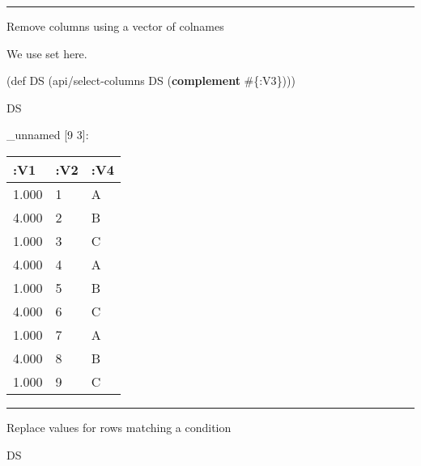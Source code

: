 \documentclass[]{article}
\newenvironment{Shaded}{\begin{snugshade}}{\end{snugshade}}
\newcommand{\KeywordTok}[1]{\textcolor[rgb]{0.13,0.29,0.53}{\textbf{#1}}}
\newcommand{\FloatTok}[1]{\textcolor[rgb]{0.00,0.00,0.81}{#1}}
\newcommand{\FunctionTok}[1]{\textcolor[rgb]{0.00,0.00,0.00}{#1}}
\newcommand{\VariableTok}[1]{\textcolor[rgb]{0.00,0.00,0.00}{#1}}
\newcommand{\BuiltInTok}[1]{#1}
\newcommand{\AttributeTok}[1]{\textcolor[rgb]{0.77,0.63,0.00}{#1}}
\newcommand{\NormalTok}[1]{#1}
\begin{document}
\begin{center}\rule{0.5\linewidth}{0.5pt}\end{center}

Remove columns using a vector of colnames

We use set here.

\begin{Shaded}
\begin{Highlighting}[]
\NormalTok{(}\BuiltInTok{def}\FunctionTok{ DS }\NormalTok{(api/select-columns DS (}\KeywordTok{complement}\NormalTok{ #\{}\AttributeTok{:V3}\NormalTok{\})))}
\end{Highlighting}
\end{Shaded}

\begin{Shaded}
\begin{Highlighting}[]
\NormalTok{DS}
\end{Highlighting}
\end{Shaded}

\_unnamed {[}9 3{]}:

\begin{longtable}[]{@{}lll@{}}
\toprule
:V1 & :V2 & :V4\tabularnewline
\midrule
\endhead
1.000 & 1 & A\tabularnewline
4.000 & 2 & B\tabularnewline
1.000 & 3 & C\tabularnewline
4.000 & 4 & A\tabularnewline
1.000 & 5 & B\tabularnewline
4.000 & 6 & C\tabularnewline
1.000 & 7 & A\tabularnewline
4.000 & 8 & B\tabularnewline
1.000 & 9 & C\tabularnewline
\bottomrule
\end{longtable}

\begin{center}\rule{0.5\linewidth}{0.5pt}\end{center}

Replace values for rows matching a condition

\begin{Shaded}
\end{Shaded}

\begin{Shaded}
\begin{Highlighting}[]
\NormalTok{DS}
\end{Highlighting}
\end{Shaded}
\end{document}

